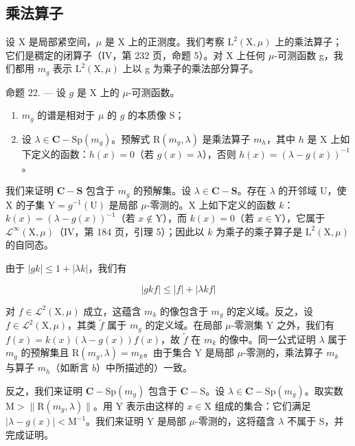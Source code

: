 \subsection{乘法算子}

设 X 是局部紧空间，\(\mu\) 是 X 上的正测度。我们考察 \(\mathrm{L}^{2}(\mathrm{X},\mu)\) 上的乘法算子；它们是稠定的闭算子（IV，第 232 页，命题 5）。对 X 上任何 \(\mu\)-可测函数 g，我们都用 \(m_{g}\) 表示 \(\mathrm{L}^{2}(\mathrm{X},\mu)\) 上以 g 为乘子的乘法部分算子。

命题 22. — 设 \(g\) 是 X 上的 \(\mu\)-可测函数。

\begin{enumerate}
\def\labelenumi{\alph{enumi})}
\item
  \(m_{g}\) 的谱是相对于 \(\mu\) 的 \(g\) 的本质像 S；
\item
  设 \(\lambda \in \mathbf{C} - \mathrm{Sp}(m_g)\)。预解式 \(\mathrm{R}(m_g, \lambda)\) 是乘法算子 \(m_h\)，其中 \(h\) 是 X 上如下定义的函数：\(h(x) = 0\)（若 \(g(x) = \lambda\)），否则 \(h(x) = (\lambda - g(x))^{-1}\)。
\end{enumerate}

我们来证明 \(\mathbf{C} - \mathbf{S}\) 包含于 \(m_g\) 的预解集。设 \(\lambda \in \mathbf{C} - \mathbf{S}\)。存在 \(\lambda\) 的开邻域 U，使 X 的子集 \(\mathrm{Y} = g^{-1}(\mathrm{U})\) 是局部 \(\mu\)-零测的。X 上如下定义的函数 \(k\)：\(k(x) = (\lambda - g(x))^{-1}\)（若 \(x \notin \mathrm{Y}\)），而 \(k(x) = 0\)（若 \(x \in \mathrm{Y}\)），它属于 \(\mathcal{L}^{\infty}(\mathrm{X}, \mu)\)（IV，第 184 页，引理 5）；因此以 \(k\) 为乘子的乘子算子是 \(\mathrm{L}^{2}(\mathrm{X}, \mu)\) 的自同态。

由于 \(|gk| \leqslant 1 + |\lambda k|\)，我们有

\[
| g k f | \leqslant | f | + | \lambda k f |
\]

对 \(f \in \mathcal{L}^2(\mathrm{X},\mu)\) 成立，这蕴含 \(m_k\) 的像包含于 \(m_g\) 的定义域。反之，设 \(f \in \mathcal{L}^2(\mathrm{X},\mu)\)，其类 \(\widetilde{f}\) 属于 \(m_g\) 的定义域。在局部 \(\mu\)-零测集 Y 之外，我们有 \(f(x) = k(x)(\lambda - g(x))f(x)\)，故 \(\widetilde{f}\) 在 \(m_k\) 的像中。同一公式证明 \(\lambda\) 属于 \(m_g\) 的预解集且 \(\mathrm{R}(m_g,\lambda) = m_k\)。由于集合 Y 是局部 \(\mu\)-零测的，乘法算子 \(m_k\) 与算子 \(m_h\)（如断言 \(b\)）中所描述的）一致。

反之，我们来证明 \(\mathbf{C} - \mathrm{Sp}(m_g)\) 包含于 \(\mathbf{C} - \mathrm{S}\)。设 \(\lambda \in \mathbf{C} - \mathrm{Sp}(m_g)\)。取实数 \(\mathrm{M} > \| \mathrm{R}(m_g, \lambda) \|\)。用 Y 表示由这样的 \(x \in \mathrm{X}\) 组成的集合：它们满足 \(|\lambda - g(x)| < \mathrm{M}^{-1}\)。我们来证明 Y 是局部 \(\mu\)-零测的，这将蕴含 \(\lambda\) 不属于 S，并完成证明。

